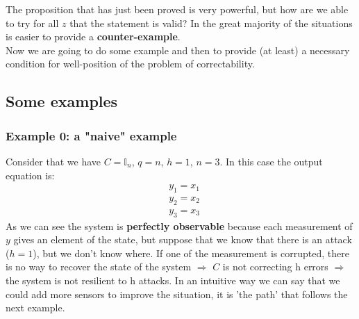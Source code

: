 \noindent
The proposition that has just been proved is very powerful, but how are we able to try for all $z$ that the statement is valid? In the great majority of the situations is easier to provide a \textbf{counter-example}.\\
Now we are going to do some example and then to provide (at least) a necessary condition for well-position of the problem of correctability. 

\subsection{Some examples}
{\color{orange}\subsubsection{Example 0: a "naive" example}}
Consider that we have $C=\mathbb{I}_n$, $q=n$, $h=1$, $n=3$. In this case the output equation is: 
\begin{align*}
    &y_1=x_1\\
    &y_2=x_2\\
    &y_3=x_3
\end{align*}
As we can see the system is \textbf{perfectly observable} because each measurement of $y$ gives an element of the state, but suppose that we know that there is an attack ($h=1$), but we don't know where. If one of the measurement is corrupted, there is no way to recover the state of the system $\Rightarrow$ $C$ is not correcting h errors $\Rightarrow$ the system is not resilient to h attacks. In an intuitive way we can say that we could add more sensors to improve the situation, it is 'the path' that follows the next example.

